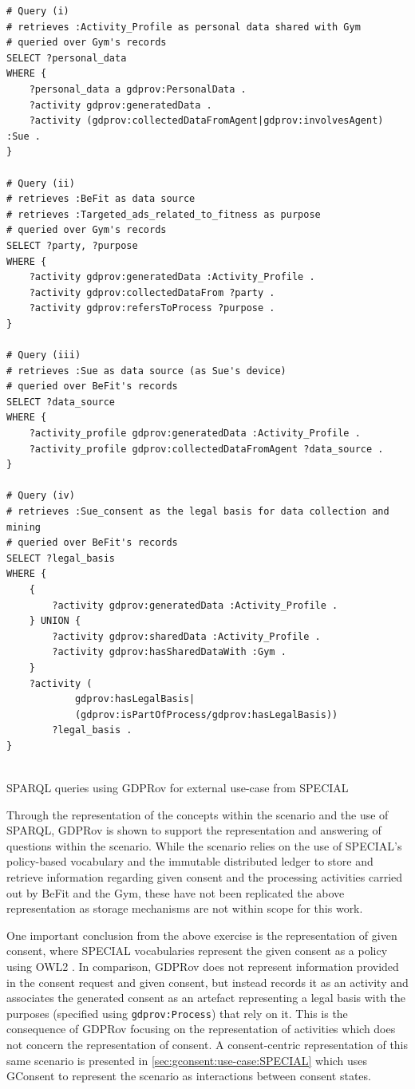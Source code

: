 \begin{listing}[htbp]
\begin{verbatim}
# Query (i)
# retrieves :Activity_Profile as personal data shared with Gym
# queried over Gym's records
SELECT ?personal_data 
WHERE {
    ?personal_data a gdprov:PersonalData .
    ?activity gdprov:generatedData .
    ?activity (gdprov:collectedDataFromAgent|gdprov:involvesAgent) :Sue .
}

# Query (ii)
# retrieves :BeFit as data source
# retrieves :Targeted_ads_related_to_fitness as purpose
# queried over Gym's records
SELECT ?party, ?purpose 
WHERE {
    ?activity gdprov:generatedData :Activity_Profile .
    ?activity gdprov:collectedDataFrom ?party .
    ?activity gdprov:refersToProcess ?purpose .
}

# Query (iii)
# retrieves :Sue as data source (as Sue's device)
# queried over BeFit's records
SELECT ?data_source 
WHERE {
    ?activity_profile gdprov:generatedData :Activity_Profile .
    ?activity_profile gdprov:collectedDataFromAgent ?data_source .   
}

# Query (iv)
# retrieves :Sue_consent as the legal basis for data collection and mining
# queried over BeFit's records
SELECT ?legal_basis 
WHERE {
    {
        ?activity gdprov:generatedData :Activity_Profile .
    } UNION {
        ?activity gdprov:sharedData :Activity_Profile .
        ?activity gdprov:hasSharedDataWith :Gym .
    }
    ?activity (
            gdprov:hasLegalBasis|
            (gdprov:isPartOfProcess/gdprov:hasLegalBasis))
        ?legal_basis .
}


\end{verbatim}
\caption{SPARQL queries using GDPRov for external use-case from SPECIAL}
\label{code:gdprov:use-case:special-sparql}
\end{listing}

Through the representation of the concepts within the scenario and the use of SPARQL, GDPRov is shown to support the representation and answering of questions within the scenario. While the scenario relies on the use of SPECIAL's policy-based vocabulary and the immutable distributed ledger to store and retrieve information regarding given consent and the processing activities carried out by BeFit and the Gym, these have not been replicated the above representation as storage mechanisms are not within scope for this work.

One important conclusion from the above exercise is the representation of given consent, where SPECIAL vocabularies represent the given consent as a policy using OWL2 \cite{kirrane_scalable_2018}.
In comparison, GDPRov does not represent information provided in the consent request and given consent, but instead records it as an activity and associates the generated consent as an artefact representing a legal basis with the purposes (specified using \texttt{gdprov:Process}) that rely on it. 
This is the consequence of GDPRov focusing on the representation of activities which does not concern the representation of consent.
A consent-centric representation of this same scenario is presented in \autoref{sec:gconsent:use-case:SPECIAL} which uses GConsent to represent the scenario as interactions between consent states.

